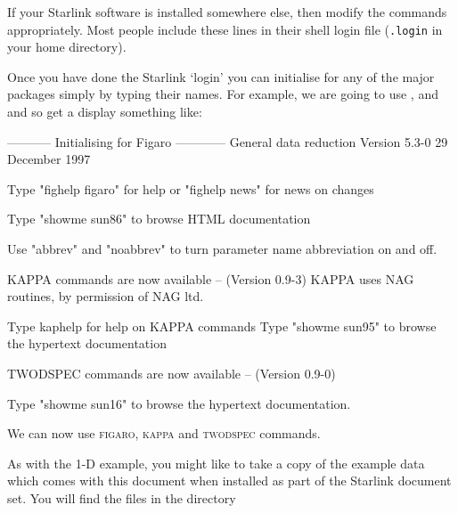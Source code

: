 \documentclass[twoside,11pt]{starlink}
\providecommand{\scspec}[2]{#1}
\begin{document}
{
\scspec{\small}{ }
\begin{terminalv}
\end{terminalv}
}

If your Starlink software is installed somewhere else,
then modify the commands appropriately.
Most people include these lines in their shell login file
(\verb+.login+ in your home directory).

Once you have done the Starlink `login' you can initialise for any of the
major packages simply by typing their names.
For example, we are going to use
\cite{figaro}, \cite{kappa} and
\cite{twodspec} and so get a display
something like:

{
\scspec{\small}{ }
\begin{terminalv}


 ----------- Initialising for  Figaro ------------
              General data reduction
            Version 5.3-0  29 December 1997

          Type "fighelp figaro" for help
      or "fighelp news" for news on changes

 Type "showme sun86" to browse HTML documentation

 Use "abbrev" and "noabbrev" to turn parameter name
 abbreviation on and off.



      KAPPA commands are now available -- (Version 0.9-3)
      KAPPA uses NAG routines, by permission of NAG ltd.

      Type kaphelp for help on KAPPA commands
      Type "showme sun95" to browse the hypertext documentation



   TWODSPEC commands are now available -- (Version 0.9-0)

   Type "showme sun16" to browse the hypertext documentation.
\end{terminalv}
}

We can now use \textsc{figaro}, \textsc{kappa} and \textsc{twodspec} commands.

As with the 1-D example, you might like to take a copy of the example
data which comes with this document when installed as part of the
Starlink document set. You will find the files in the directory
\end{document}
